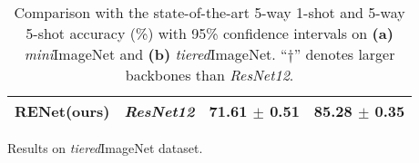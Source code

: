 \documentclass[10pt,twocolumn,letterpaper]{article}
\newcommand{\ours}{RENet\xspace}
\newcommand{\ccol}{\cellcolor{grey}}
\begin{document}
\begin{table}[t!]
\begin{subtable}{.5\textwidth}
{\begin{tabular}{lccc}
\ccol \textbf{\ours (ours)}  & \ccol \emph{ResNet12}  & \ccol \textbf{71.61 $\pm$ 0.51} & \ccol 85.28 $\pm$ 0.35 \\ \bottomrule
\end{tabular}
}
\caption{\small Results on \emph{tiered}ImageNet dataset.}
\end{subtable}
\caption{Comparison with the state-of-the-art 5-way 1-shot and 5-way 5-shot accuracy (\%) with 95\% confidence intervals on \textbf{(a)} \emph{mini}ImageNet and \textbf{(b)} \emph{tiered}ImageNet. 
``$\dag$'' denotes larger backbones than \emph{ResNet12}. }
\label{table:sota1}	
\vspace{-2mm}
\end{table}
\end{document}
